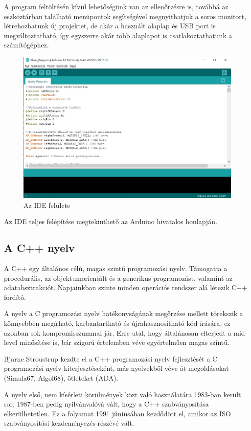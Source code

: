 \documentclass[]{thesis-ekf}
\theoremstyle{definition}
\begin{document}
A program feltöltésén kívül lehetőségünk van az ellenőrzésre is, továbbá az eszköztárban található menüpontok segítségével megnyithatjuk a soros monitort, létrehozhatunk új projektet, de akár a használt alaplap és USB port is megváltoztatható, így egyszerre akár több alaplapot is csatlakoztathatunk a számítógéphez.
\begin{figure}[h]
	\centering
	\includegraphics[width=\linewidth]{images/arduino/IDE_felépítés}
	\caption{Az IDE felülete}
	\label{IDE_felépítés}
\end{figure}

Az IDE teljes felépítése megtekinthető az Arduino hivatalos honlapján\cite{Arduino IDE}.
\subsection{A C++ nyelv}
A C++\cite{CPP} egy általános célú, magas szintű programozási nyelv. Támogatja a procedurális, az objektumorientált és a generikus programozást, valamint az adatabsztrakciót. Napjainkban szinte minden operációs rendszer alá létezik C++ fordító.

A nyelv a C programozási nyelv hatékonyságának megőrzése mellett törekszik a könnyebben megírható, karbantartható és újrahasznosítható kód írására, ez azonban sok kompromisszummal jár. Erre utal, hogy általánosan elterjedt a mid-level minősítése is, bár szigorú értelemben véve egyértelműen magas szintű.

Bjarne Stroustrup kezdte el a C++ programozási nyelv fejlesztését a C programozási nyelv kiterjesztéseként, más nyelvekből véve át megoldásokat (Simula67, Algol68), ötleteket (ADA).

A nyelv első, nem kísérleti körülmények közt való használatára 1983-ban került sor, 1987-ben pedig nyilvánvalóvá vált, hogy a C++ szabványosítása elkerülhetetlen. Ez a folyamat 1991 júniusában kezdődött el, amikor az ISO szabványosítási kezdeményezés részévé vált.
\end{document}
